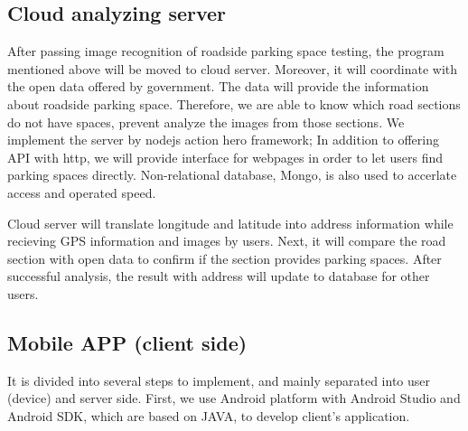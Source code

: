 \documentclass[runningheads,a4paper]{llncs}
\begin{document}
\begin{CJK}{UTF8}{bsmi}
\subsection{Cloud analyzing server}

After passing image recognition of roadside parking space testing, the
program mentioned above will be moved to cloud server. Moreover, it will
coordinate with the open data offered by government. The data will
provide the information about roadside parking space. Therefore, we are
able to know which road sections do not have spaces, prevent analyze the
images from those sections. We implement the server by nodejs action
hero framework; In addition to offering API with http, we will provide
interface for webpages in order to let users find parking spaces
directly. Non-relational database, Mongo, is also used to accerlate
access and operated speed. 

Cloud server will translate longitude and latitude into address
information while recieving GPS information and images by users. Next,
it will compare the road section with open data to confirm if the
section provides parking spaces. After successful analysis, the result
with address will update to database for other users.

\subsection{Mobile APP (client side)}

It is divided into several steps to implement, and mainly separated into
user (device) and server side. First, we use Android platform with
Android Studio and Android SDK, which are based on JAVA, to develop
client’s application.



\end{CJK}
\end{document}
